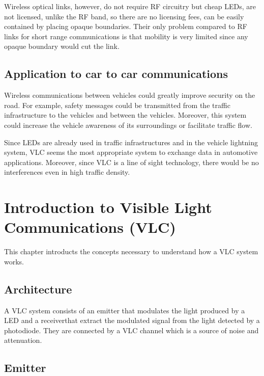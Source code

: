 \documentclass[12pt]{report}
\begin{document}
Wireless optical links, however, do not require RF circuitry but cheap LEDs, are not licensed, unlike the RF band, so there are no licensing fees, can be easily contained by placing opaque boundaries. Their only problem compared to RF links for short range communications is that mobility is very limited since any opaque boundary would cut the link.

\subsection{Application to car to car communications}

Wireless communications between vehicles could greatly improve security on the road. For example, safety messages could be transmitted from the traffic infrastructure to the vehicles and between the vehicles. Moreover, this system could increase the vehicle awareness of its surroundings or facilitate traffic flow.

Since LEDs are already used in traffic infrastructures and in the vehicle lightning system, VLC seems the most appropriate system to exchange data in automotive applications. Moreover, since VLC is a line of sight technology, there would be no interferences even in high traffic density.

















\section{Introduction to Visible Light Communications (VLC)}

This chapter introducts the concepts necessary to understand how a VLC system works.

\subsection{Architecture}

A VLC system consists of an emitter that modulates the light produced by a LED and a receiverthat extract the modulated signal from the light detected by a photodiode. They are connected by a VLC channel which is a source of noise and attenuation.

\subsection{Emitter}
\end{document}
